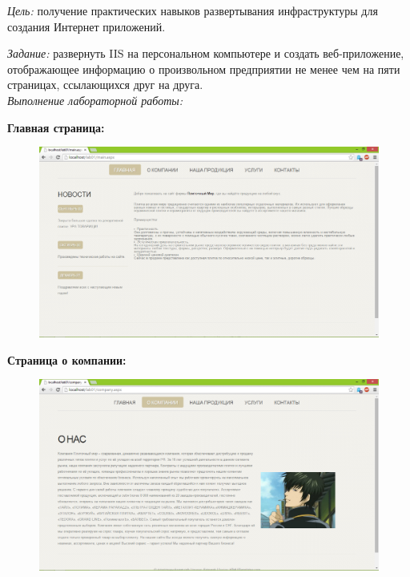 \documentclass[pscyr,12pt]{hedlab}
\begin{document}
  \makeheader

  \emph{Цель:} получение практических навыков развертывания инфраструктуры для
  создания Интернет приложений.
  
  \emph{Задание:} развернуть IIS на персональном компьютере и создать
  веб-приложение, отображающее информацию о произвольном предприятии не менее
  чем на пяти страницах, ссылающихся друг на друга. \\

  \emph{Выполнение лабораторной работы:}
  
  \textbf{Главная страница:}
  \begin{figure}[h!]
    \center
    \includegraphics[width=.95\textwidth]{lab01_01}
  \end{figure}
  
  \newpage
  
  \textbf{Страница о компании:}
  \begin{figure}[h!]
    \center
    \includegraphics[width=.95\textwidth]{lab01_02}
  \end{figure}
  
\end{document}
